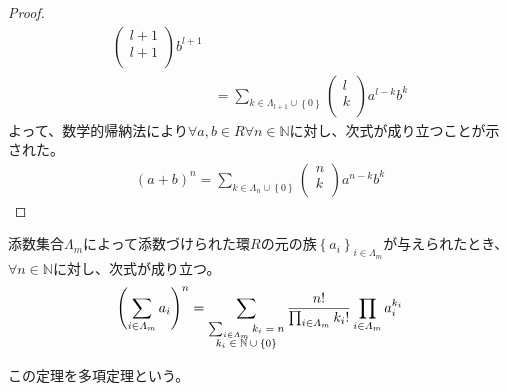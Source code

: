 \documentclass[dvipdfmx]{jsarticle}
\begin{document}
\begin{proof}
\begin{align*}
\begin{pmatrix}
l + 1 \\
l + 1 \\
\end{pmatrix}b^{l + 1}\\
&= \sum_{k \in \varLambda_{l + 1} \cup \left\{ 0 \right\}} {\begin{pmatrix}
l \\
k \\
\end{pmatrix}a^{l - k}b^{k}}
\end{align*}
よって、数学的帰納法により$\forall a,b \in R\forall n \in \mathbb{N}$に対し、次式が成り立つことが示された。
\begin{align*}
(a + b)^{n} = \sum_{k \in \varLambda_{n} \cup \left\{ 0 \right\}} {\begin{pmatrix}
n \\
k \\
\end{pmatrix}a^{n - k}b^{k}}
\end{align*}
\end{proof}
\begin{thm}[多項定理]\label{3.3.1.11}
添数集合$\varLambda_{m}$によって添数づけられた環$R$の元の族$\left\{ a_{i} \right\}_{i \in \varLambda_{m}}$が与えられたとき、$\forall n \in \mathbb{N}$に対し、次式が成り立つ。
\begin{align*}
\left( \sum_{i \in \varLambda_{m}} a_{i} \right)^{n} = \sum_{\scriptsize \begin{matrix} \sum_{i \in \varLambda_{m}} k_{i} = n \\k_{i} \in \mathbb{N} \cup \left\{ 0 \right\} \end{matrix}} {\frac{n!}{\prod_{i \in \varLambda_{m}} {k_{i}!}}\prod_{i \in \varLambda_{m}} a_{i}^{k_{i}}}
\end{align*}\par
この定理を多項定理という。
\end{thm}
\end{document}

